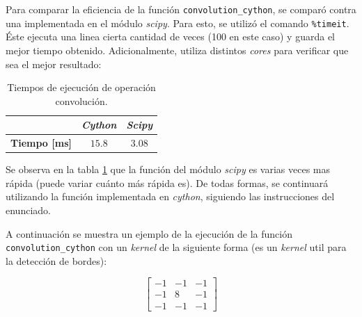 \documentclass[12pt, letterpaper]{article}
\begin{document}
\par Para comparar la eficiencia de la función \texttt{convolution\_cython}, se comparó contra una implementada en el módulo \textit{scipy}. Para esto, se utilizó el comando \texttt{\%timeit}. Éste ejecuta una linea cierta cantidad de veces (100 en este caso) y guarda el mejor tiempo obtenido. Adicionalmente, utiliza distintos \textit{cores} para verificar que sea el mejor resultado: 

\begin{table}[H]
  \centering
  \begin{tabular}{|c|c|c|}
  \hline
                          & \textit{\textbf{Cython}} & \textit{\textbf{Scipy}} \\ \hline
  \textbf{Tiempo {[}ms{]}} & $15.8$                     & $3.08$                    \\ \hline
  \end{tabular}
  \caption{Tiempos de ejecución de operación convolución.}
  \label{profile}
\end{table}

\par Se observa en la tabla \ref{profile} que la función del módulo \textit{scipy} es varias veces mas rápida (puede variar cuánto más rápida es). De todas formas, se continuará utilizando la función implementada en \textit{cython}, siguiendo las instrucciones del enunciado.


\par A continuación se muestra un ejemplo de la ejecución de la función \texttt{convolution\_cython} con un \textit{kernel} de la siguiente forma (es un \textit{kernel} util para la detección de bordes):

\begin{equation}
\begin{bmatrix}
-1 & -1 & -1 \\ 
-1 & 8 & -1 \\ 
-1 & -1 & -1
\end{bmatrix}
\end{equation}
\end{document}

